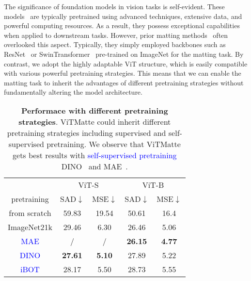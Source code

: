 \documentclass[10pt,twocolumn,letterpaper]{article}
\newcommand{\thename}{ViTMatte}
\begin{document}
The significance of foundation models in vision tasks is self-evident. These models~\cite{he2022masked, EVA, EVA02, dino, ibot} are typically pretrained using advanced techniques, extensive data, and powerful computing resources. As a result, they possess exceptional capabilities when applied to downstream tasks. However, prior matting methods~\cite{GCAMatting, MGM, matteformer, rmat} often overlooked this aspect. Typically, they simply employed backbones such as ResNet~\cite{res} or SwinTransformer~\cite{swin} pre-trained on ImageNet for the matting task. By contrast, we adopt the highly adaptable ViT structure, which is easily compatible with various powerful pretraining strategies. This means that we can enable the matting task to inherit the advantages of different pretraining strategies without fundamentally altering the model architecture.

\begin{table}[tbp]
    \centering
    \renewcommand{\arraystretch}{1.2}
    \begin{tabular}{c|cc|cc}
    \toprule
                     & \multicolumn{2}{c|}{ViT-S} & \multicolumn{2}{c}{ViT-B} \\
    pretraining      & SAD$\downarrow$  & MSE$\downarrow$ & SAD$\downarrow$  & MSE$\downarrow$ \\
    \midrule
    from scratch     & 59.83          & 19.54         & 50.61  & 16.4 \\
    ImageNet21k      & 29.46          & 6.30          & 26.46  & 5.06 \\
    \textcolor{blue}{MAE}              & /              &/              & \textbf{26.15} &\textbf{4.77} \\
    \textcolor{blue}{DINO}             & \textbf{27.61} &\textbf{5.10}  & 27.89  & 5.22 \\
    \textcolor{blue}{iBOT}             & 28.17          & 5.50          & 28.73  & 5.55 \\
    \bottomrule
    \end{tabular}
    \caption{\textbf{Performace with different pretraining strategies}. \thename{} could inherit different pretraining strategies including supervised and self-supervised pretraining. We observe that \thename{} gets best results with \textcolor{blue}{self-supervised pretraining} DINO~\cite{dino} and MAE~\cite{he2022masked}. }
    \label{pretraining}
\end{table}
\end{document}
